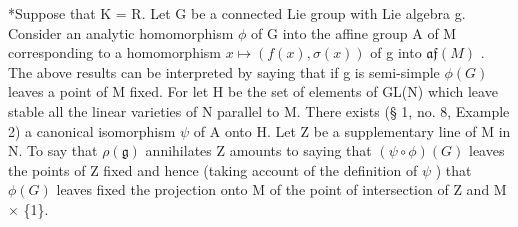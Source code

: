 *Suppose that K = R. Let G be a connected Lie group with Lie algebra g. Consider an analytic homomorphism \(\phi\) of G into the affine group A of M corresponding to a homomorphism \(x \mapsto (f(x), \sigma(x))\) of g into \(\mathfrak{af}(M)\) . The above results can be interpreted by saying that if g is semi-simple \(\phi(G)\) leaves a point of M fixed. For let H be the set of elements of GL(N) which leave stable all the linear varieties of N parallel to M. There exists (§ 1, no. 8, Example 2) a canonical isomorphism \(\psi\) of A onto H. Let Z be a supplementary line of M in N. To say that \(\rho(\mathfrak{g})\) annihilates Z amounts to saying that \((\psi \circ \phi)(G)\) leaves the points of Z fixed and hence (taking account of the definition of \(\psi\) ) that \(\phi(G)\) leaves fixed the projection onto M of the point of intersection of Z and M × \{1\}.


